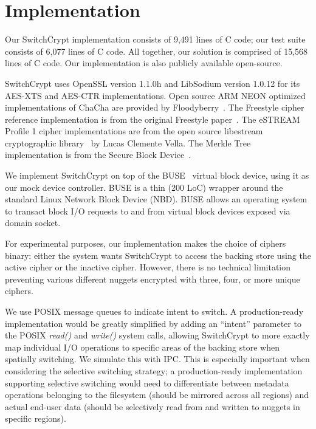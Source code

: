 \section{Implementation} \label{sec:sc-implementation}

Our SwitchCrypt implementation consists of 9,491 lines of C code; our test suite
consists of 6,077 lines of C code. All together, our solution is comprised of
15,568 lines of C code. Our implementation is also publicly available
open-source.

SwitchCrypt uses OpenSSL version 1.1.0h and LibSodium version 1.0.12 for its
AES-XTS and AES-CTR implementations. Open source ARM NEON optimized
implementations of ChaCha are provided by Floodyberry~\cite{Floodyberry}. The
Freestyle cipher reference implementation is from the original Freestyle
paper~\cite{Freestyle}. The eSTREAM Profile 1 cipher implementations are from
the open source libestream cryptographic library~\cite{libestream} by Lucas
Clemente Vella. The Merkle Tree implementation is from the Secure Block
Device~\cite{SBD}.

We implement SwitchCrypt on top of the BUSE~\cite{BUSE} virtual block device,
using it as our mock device controller. BUSE is a thin (200 LoC) wrapper around
the standard Linux Network Block Device (NBD). BUSE allows an operating system
to transact block I/O requests to and from virtual block devices exposed via
domain socket.

For experimental purposes, our implementation makes the choice of ciphers
binary: either the system wants SwitchCrypt to access the backing store using
the active cipher or the inactive cipher. However, there is no technical
limitation preventing various different nuggets encrypted with three, four, or
more unique ciphers.

We use POSIX message queues to indicate intent to switch. A production-ready
implementation would be greatly simplified by adding an ``intent'' parameter to
the POSIX \textit{read()} and \textit{write()} system calls, allowing
SwitchCrypt to more exactly map individual I/O operations to specific areas of
the backing store when spatially switching. We simulate this with IPC. This is
especially important when considering the selective switching strategy; a
production-ready implementation supporting selective switching would need to
differentiate between metadata operations belonging to the filesystem (should be
mirrored across all regions) and actual end-user data (should be selectively
read from and written to nuggets in specific regions).

